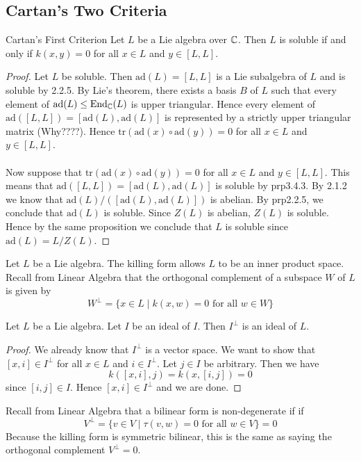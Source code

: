 \documentclass[a4paper]{article}
\begin{document}
\subsection{Cartan's Two Criteria}
\begin{thm}{Cartan's First Criterion}{} Let $L$ be a Lie algebra over $\mathbb{C}$. Then $L$ is soluble if and only if $k(x,y)=0$ for all $x\in L$ and $y\in[L,L]$. \tcbline
\begin{proof}
Let $L$ be soluble. Then $\text{ad}(L)=[L,L]$ is a Lie subalgebra of $L$ and is soluble by 2.2.5. By Lie's theorem, there exists a basis $B$ of $L$ such that every element of $\text{ad}(L)\leq\text{End}_{\mathbb{C}}(L)$ is upper triangular. Hence every element of $\text{ad}([L,L])=[\text{ad}(L),\text{ad}(L)]$ is represented by a strictly upper triangular matrix (Why????). Hence $\text{tr}(\text{ad}(x)\circ\text{ad}(y))=0$ for all $x\in L$ and $y\in[L,L]$. \\~\\

Now suppose that $\text{tr}(\text{ad}(x)\circ\text{ad}(y))=0$ for all $x\in L$ and $y\in[L,L]$. This means that $\text{ad}([L,L])=[\text{ad}(L),\text{ad}(L)]$ is soluble by prp3.4.3. By 2.1.2 we know that $\text{ad}(L)/([\text{ad}(L),\text{ad}(L)])$ is abelian. By prp2.2.5, we conclude that $\text{ad}(L)$ is soluble. Since $Z(L)$ is abelian, $Z(L)$ is soluble. Hence by the same proposition we conclude that $L$ is soluble since $\text{ad}(L)=L/Z(L)$. 
\end{proof}
\end{thm}

Let $L$ be a Lie algebra. The killing form allows $L$ to be an inner product space. Recall from Linear Algebra that the orthogonal complement of a subspace $W$ of $L$ is given by $$W^\perp=\{x\in L\;|\;k(x,w)=0\text{ for all }w\in W\}$$

\begin{lmm}{}{} Let $L$ be a Lie algebra. Let $I$ be an ideal of $I$. Then $I^\perp$ is an ideal of $L$. \tcbline
\begin{proof}
We already know that $I^\perp$ is a vector space. We want to show that $[x,i]\in I^\perp$ for all $x\in L$ and $i\in I^\perp$. Let $j\in I$ be arbitrary. Then we have $$k([x,i],j)=k(x,[i,j])=0$$ since $[i,j]\in I$. Hence $[x,i]\in I^\perp$ and we are done. 
\end{proof}
\end{lmm}

Recall from Linear Algebra that a bilinear form is non-degenerate if  if $$V^\perp=\{v\in V\;|\;\tau(v,w)=0\text{ for all }w\in V\}=0$$ Because the killing form is symmetric bilinear, this is the same as saying the orthogonal complement $V^\perp=0$. 
\end{document}
